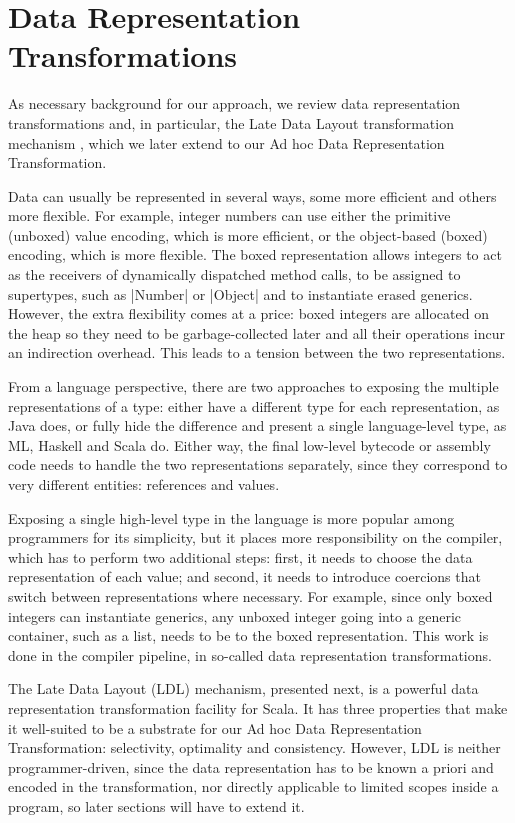 \vspace{-0.8em}

\section{Data Representation Transformations}
\label{sec:drt}

As necessary background for our approach, we review data representation transformations and, in particular, the Late Data Layout transformation mechanism \cite{ldl}, which we later extend to our Ad hoc Data Representation Transformation.

Data can usually be represented in several ways, some more efficient and others more flexible. For example, integer numbers can use either the primitive (unboxed) value encoding, which is more efficient, or the object-based (boxed) encoding, which is more flexible. The boxed representation allows integers to act as the receivers of dynamically dispatched method calls, to be assigned to supertypes, such as |Number| or |Object| and to instantiate erased generics. However, the extra flexibility comes at a price: boxed integers are allocated on the heap so they need to be garbage-collected later and all their operations incur an indirection overhead. This leads to a tension between the two representations.

From a language perspective, there are two approaches to exposing the multiple representations of a type: either have a different type for each representation, as Java does, or fully hide the difference and present a single language-level type, as ML, Haskell and Scala do. Either way, the final low-level bytecode or assembly code needs to handle the two representations separately, since they correspond to very different entities: references and values.

Exposing a single high-level type in the language is more popular among programmers for its simplicity, but it places more responsibility on the compiler, which has to perform two additional steps: first, it needs to choose the data representation of each value; and second, it needs to introduce coercions that switch between representations where necessary. For example, since only boxed integers can instantiate generics, any unboxed integer going into a generic container, such as a list, needs to be  to the boxed representation. This work is done in the compiler pipeline, in so-called data representation transformations.

The Late Data Layout (LDL) mechanism, presented next, is a powerful data
representation transformation facility for Scala.  It has three
properties that make it well-suited to be a substrate for our Ad hoc
Data Representation Transformation: selectivity, optimality and
consistency. However, LDL is neither programmer-driven, since the
data representation has to be known a priori and encoded in the
transformation, nor directly applicable to limited scopes inside a program,
so later sections will have to extend it.

